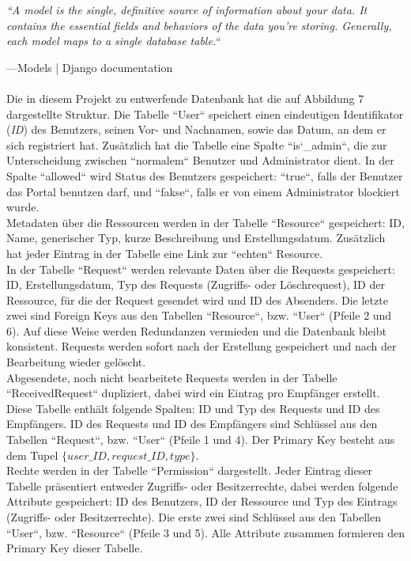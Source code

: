 \documentclass[parskip=full,11pt]{scrartcl}
\begin{document}
    \begin{center}
    \textit{``A model is the single, definitive source of information about your data. It contains the essential fields and behaviors of the data you’re storing. Generally, each model maps to a single database table.``}
    \end{center}
    —Models | Django documentation\\\\
Die in diesem Projekt zu entwerfende Datenbank hat die auf Abbildung 7 dargestellte Struktur.    
Die Tabelle ``User`` speichert einen eindeutigen Identifikator (\textit{ID}) des Benutzers, seinen Vor- und Nachnamen, sowie das Datum, an dem er sich registriert hat. Zusätzlich hat die Tabelle eine Spalte ``is\char`_admin``, die zur Unterscheidung zwischen ``normalem`` Benutzer und Administrator dient. In der Spalte ``allowed`` wird Status des Benutzers gespeichert: ``true``, falls der Benutzer das Portal benutzen darf, und ``fakse``, falls er von einem Administrator blockiert wurde.\\
Metadaten über die Ressourcen werden in der Tabelle ``Resource`` gespeichert: ID, Name, generischer Typ, kurze Beschreibung und Erstellungsdatum. Zusätzlich hat jeder Eintrag in der Tabelle eine Link zur ``echten`` Resource.\\
In der Tabelle ``Request`` werden relevante Daten über die Requests gespeichert: ID, Erstellungsdatum, Typ des Requests (Zugriffs- oder Löschrequest), ID der Ressource, für die der Request gesendet wird und ID des Absenders. Die letzte zwei sind Foreign Keys aus den Tabellen ``Resource``, bzw. ``User`` (Pfeile 2 und 6). Auf diese Weise werden Redundanzen vermieden und die Datenbank bleibt konsistent. Requests werden sofort nach der Erstellung gespeichert und nach der Bearbeitung wieder gelöscht.\\
Abgesendete, noch nicht bearbeitete Requests werden in der Tabelle ``ReceivedRequest`` dupliziert, dabei wird ein Eintrag pro Empfänger erstellt. Diese Tabelle enthält folgende Spalten: ID und Typ des Requests und ID des Empfängers. ID des Requests und ID des Empfängers sind Schlüssel aus den Tabellen ``Request``, bzw. ``User`` (Pfeile 1 und 4).  Der Primary Key besteht aus dem Tupel $\{user{\_}ID, request{\_}ID, type\}$.\\
Rechte werden in der Tabelle ``Permission`` dargestellt. Jeder Eintrag dieser Tabelle präsentiert entweder Zugriffs- oder Besitzerrechte, dabei werden folgende Attribute gespeichert: ID des Benutzers, ID der Ressource und Typ des Eintrags (Zugriffs- oder Besitzerrechte). Die erste zwei sind Schlüssel aus den Tabellen ``User``, bzw. ``Resource`` (Pfeile 3 und 5). Alle Attribute zusammen formieren den Primary Key dieser Tabelle. \\
 
\end{document}
